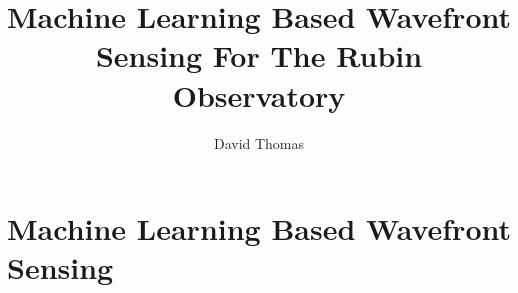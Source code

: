 \documentclass[12pt]{report}
\begin{document}
\title{Machine Learning Based Wavefront Sensing For The Rubin Observatory}
\author{David Thomas}


\beforepreface
\afterpreface


% 
\part{Machine Learning Based Wavefront Sensing}








% 



\onlinesignature
\end{document}
